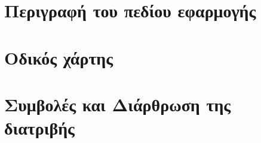 \chapter{Περιγραφή του πεδίου εφαρμογής}


\chapter{Οδικός χάρτης}


\chapter{Συμβολές και Διάρθρωση της διατριβής}

